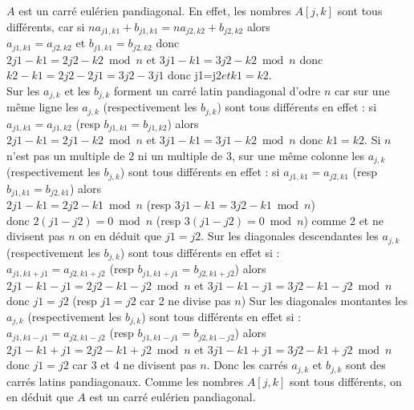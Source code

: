 \documentclass[a4paper,11pt]{book}
\begin{document}
$A$ est un carr\'e eul\'erien pandiagonal.
En effet, les nombres $A[j,k]$ sont tous diff\'erents, car si
$na_{j1,k1}+b_{j1,k1}=na_{j2,k2}+b_{j2,k2}$ alors \\
$a_{j1,k1}=a_{j2,k2}$ et $b_{j1,k1}=b_{j2,k2}$ donc\\
$2j1-k1 =2j2-k2 \bmod n$ et $3j1-k1 =3j2-k2 \bmod n$ donc\\
$k2-k1=2j2-2j1=3j2-3j1$  donc j1=j2$ et k1=k2$.\\
Sur les $a_{j,k}$ et les $b_{j,k}$ forment un carr\'e latin pandiagonal d'odre 
$n$ car sur une m\^eme ligne les $a_{j,k}$ (respectivement les $b_{j,k}$)
sont tous diff\'erents en effet :
si $a_{j1,k1}=a_{j1,k2}$ (resp $b_{j1,k1}=b_{j1,k2}$) alors\\
$2j1-k1 =2j1-k2 \bmod n$ et $3j1-k1 =3j1-k2 \bmod n$ 
donc $k1=k2$.
Si $n$ n'est pas un multiple de 2 ni un multiple de 3, sur une m\^eme colonne 
les $a_{j,k}$ (respectivement les $b_{j,k}$) sont tous diff\'erents en effet :
si $a_{j1,k1}=a_{j2,k1}$ (resp $b_{j1,k1}=b_{j2,k1}$) alors\\
$2j1-k1 =2j2-k1 \bmod n$ (resp $3j1-k1 =3j2-k1 \bmod n$) \\
donc $2(j1-j2)=0 \bmod n$ (resp $3(j1-j2)=0 \bmod n$)
comme 2 et ne divisent pas $n$ on en d\'eduit que $j1=j2$.
Sur les diagonales descendantes les $a_{j,k}$ (respectivement les $b_{j,k}$) sont tous diff\'erents en effet si :\\
$a_{j1,k1+j1}=a_{j2,k1+j2}$ (resp $b_{j1,k1+j1}=b_{j2,k1+j2}$) alors\\
$2j1-k1-j1 =2j2-k1-j2 \bmod n$ et $3j1-k1-j1 =3j2-k1-j2 \bmod n$ 
donc $j1=j2$ (resp $j1=j2$ car 2 ne divise pas $n$)
Sur les diagonales montantes les $a_{j,k}$ (respectivement les $b_{j,k}$) sont 
tous diff\'erents en effet si :\\
$a_{j1,k1-j1}=a_{j2,k1-j2}$ (resp $b_{j1,k1-j1}=b_{j2,k1-j2}$) alors\\
$2j1-k1+j1 =2j2-k1+j2 \bmod n$ et $3j1-k1+j1 =3j2-k1+j2 \bmod n$ 
donc $j1=j2$  car 3 et 4 ne divisent pas $n$.
Donc les carr\'es $a_{j,k}$ et $b_{j,k}$ sont des carr\'es latins pandiagonaux.
Comme les nombres $A[j,k]$ sont tous diff\'erents, on en d\'eduit que $A$ est 
un carr\'e eul\'erien pandiagonal.
\end{document}
